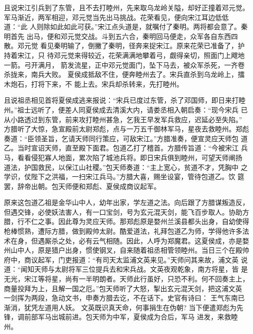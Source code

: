 且说宋江引兵到了东管，且不去打睦州，先来取乌龙岭关隘，却好正撞着邓元觉。
军马渐近，两军相迎，邓元觉当先出马挑战。花荣看见，便向宋江耳边低低道：“此
人则除如此如此可获。”宋江点头道是，就嘱付了秦明。两将都会意了。秦明首先
出马，便和邓元觉交战。斗到五六合，秦明回马便走，众军各自东西四散。邓元觉
看见秦明输了，倒撇了秦明，径奔来捉宋江。原来花荣已准备了，护持着宋江，只
待邓元觉来得较近，花荣满满地攀着弓，觑得亲切，照面门上飕地一箭。弓开满月，
箭发流星，正中邓元觉面门，坠下马去，被众军杀死，一齐卷杀拢来，南兵大败。
夏侯成抵敌不住，便奔睦州去了。宋兵直杀到乌龙岭上，擂木炮石，打将下来，不
能上去。宋兵却杀转来，先打睦州。

且说祖丞相见首将夏侯成逃来报说：“宋兵已度过东管，杀了邓国师，即日来打睦
州。”祖士远听了，便差人同夏侯成去清溪大内，请娄丞相入朝启奏：“现今宋兵
已从小路透过到东管，前来攻打睦州甚急，乞我王早发军兵救应，迟延必至失陷。”
方腊听了大惊，急宣殿前太尉郑彪，点与一万五千御林军马，星夜去救睦州。郑彪
奏道：“臣领圣旨，乞请天师同行策应，可敌宋江。”方腊准奏，便宣灵应天师包
道乙。当时宣诏天师，直至殿下面君。包道乙打了稽首。方腊传旨道：“今被宋江
兵马，看看侵犯寡人地面，累次陷了城池兵将。即日宋兵俱到睦州，可望天师阐扬
道法，护国救民，以保江山社稷。”包天师奏道：“主上宽心，贫道不才，凭胸中
之学识，仗陛下之洪福，一扫宋江兵马。”方腊大喜，赐坐设宴，管待包道乙。饮
筵罢，辞帝出朝。包天师便和郑彪、夏侯成商议起军。

原来这包道乙祖是金华山中人，幼年出家，学左道之法。向后跟了方腊谋叛造反，
但遇交锋，必使妖法害人，有一口宝剑，号为玄元混天剑，能飞百步取人。协助方
腊，行不仁之事。因此尊为灵应天师。那郑彪原是婺州兰溪县都头出身，自幼使得
枪棒惯熟，遭际方腊，做到殿帅太尉。酷爱道法，礼拜包道乙为师，学得他许多法
术在身，但遇厮杀之处，必有云气相随。因此，人呼为郑魔君。这夏侯成，亦是婺
州山中人，原是猎户出身，惯使钢叉，自来随着祖丞相管领睦州。当日三个在殿帅
府中，商议起军，门吏报道：“有司天太监浦文英来见。”天师问其来故，浦文英
说道：“闻知天师与太尉将军三位提兵去和宋兵战。文英夜观乾象，南方将星，皆
是无光，宋江等将星，尚有一半明朗者。天师此行虽好，只恐不利。何不回奏主上，
商量投拜为上，且解一国之厄。”包天师听了大怒，掣出玄元混天剑，把这浦文英
一剑挥为两段，急动文书，申奏方腊去讫，不在话下。史官有诗曰：
王气东南已渐消，犹凭左道用人妖。
文英既识真天命，何事捐生在伪朝?
当下便遣郑彪为先锋，调前部军马出城前进。包天师为中军，夏侯成为合后，军马
进发，来救睦州。

